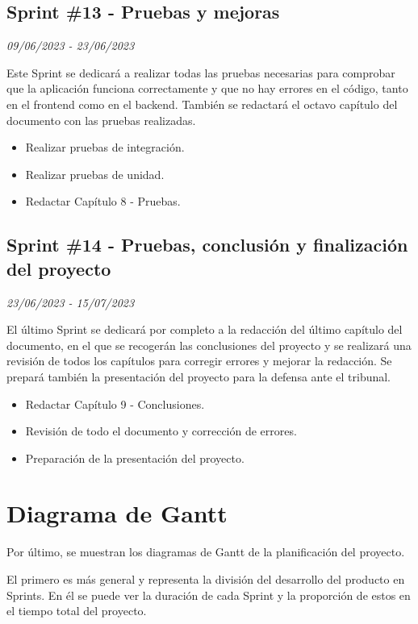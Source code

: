 \subsection{Sprint \#13 - Pruebas y mejoras}
\textit{09/06/2023   -   23/06/2023}

Este Sprint se dedicará a realizar todas las pruebas necesarias para comprobar que la aplicación funciona correctamente y que no hay errores en el código, tanto
en el frontend como en el backend. También se redactará el octavo capítulo del documento con las pruebas realizadas.

\begin{itemize}
    \item Realizar pruebas de integración.
    \item Realizar pruebas de unidad.
    \item Redactar Capítulo 8 - Pruebas.
\end{itemize}

\subsection{Sprint \#14 - Pruebas, conclusión y finalización del proyecto}
\textit{23/06/2023   -   15/07/2023}

El último Sprint se dedicará por completo a la redacción del último capítulo del documento, en el que se recogerán las conclusiones del proyecto y se realizará una revisión
de todos los capítulos para corregir errores y mejorar la redacción. Se prepará también la presentación del proyecto para la defensa ante el tribunal.
\begin{itemize}
    \item Redactar Capítulo 9 - Conclusiones.
    \item Revisión de todo el documento y corrección de errores.
    \item Preparación de la presentación del proyecto.
\end{itemize}


\section{Diagrama de Gantt}
Por último, se muestran los diagramas de Gantt de la planificación del proyecto. 


El primero es más general y representa la división del desarrollo del producto en Sprints.
En él se puede ver la duración de cada Sprint y la proporción de estos en el tiempo total del proyecto. 


